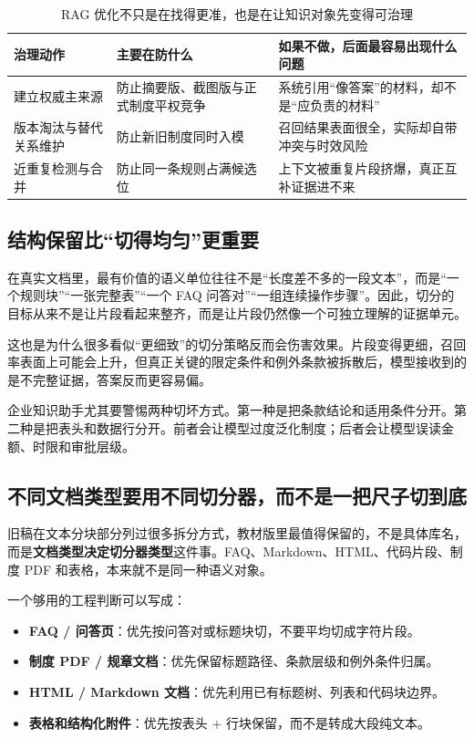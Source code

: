 \begin{table}[H]
\centering
\small
\begin{tabularx}{\textwidth}{>{\raggedright\arraybackslash}p{3cm}>{\raggedright\arraybackslash}p{3cm}>{\raggedright\arraybackslash}X}
\toprule
\textbf{治理动作} & \textbf{主要在防什么} & \textbf{如果不做，后面最容易出现什么问题} \\
\midrule
建立权威主来源 & 防止摘要版、截图版与正式制度平权竞争 & 系统引用“像答案”的材料，却不是“应负责的材料” \\
版本淘汰与替代关系维护 & 防止新旧制度同时入模 & 召回结果表面很全，实际却自带冲突与时效风险 \\
近重复检测与合并 & 防止同一条规则占满候选位 & 上下文被重复片段挤爆，真正互补证据进不来 \\
\bottomrule
\end{tabularx}
\caption{RAG 优化不只是在找得更准，也是在让知识对象先变得可治理}
\label{tab:document-canonicalization}
\end{table}

\subsection{结构保留比“切得均匀”更重要}
在真实文档里，最有价值的语义单位往往不是“长度差不多的一段文本”，而是“一个规则块”“一张完整表”“一个 FAQ 问答对”“一组连续操作步骤”。因此，切分的目标从来不是让片段看起来整齐，而是让片段仍然像一个可独立理解的证据单元。

这也是为什么很多看似“更细致”的切分策略反而会伤害效果。片段变得更细，召回率表面上可能会上升，但真正关键的限定条件和例外条款被拆散后，模型接收到的是不完整证据，答案反而更容易偏。

企业知识助手尤其要警惕两种切坏方式。第一种是把条款结论和适用条件分开。第二种是把表头和数据行分开。前者会让模型过度泛化制度；后者会让模型误读金额、时限和审批层级。

\subsection{不同文档类型要用不同切分器，而不是一把尺子切到底}
旧稿在文本分块部分列过很多拆分方式，教材版里最值得保留的，不是具体库名，而是\textbf{文档类型决定切分器类型}这件事。FAQ、Markdown、HTML、代码片段、制度 PDF 和表格，本来就不是同一种语义对象。

一个够用的工程判断可以写成：
\begin{itemize}
  \item \textbf{FAQ / 问答页}：优先按问答对或标题块切，不要平均切成字符片段。
  \item \textbf{制度 PDF / 规章文档}：优先保留标题路径、条款层级和例外条件归属。
  \item \textbf{HTML / Markdown 文档}：优先利用已有标题树、列表和代码块边界。
  \item \textbf{表格和结构化附件}：优先按表头 + 行块保留，而不是转成大段纯文本。
\end{itemize}

